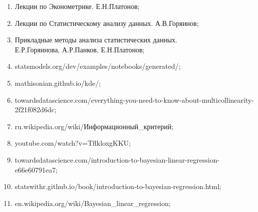\documentclass[a4paper,12pt]{article}
\begin{document}
\begin{enumerate}
    \item Лекции по Эконометрике. Е.Н.Платонов;
    \item Лекции по Статистическому анализу данных. А.В.Горяинов;
    \item Прикладные методы анализа статистических данных.\\
    Е.Р.Горяинова, А.Р.Панков, Е.Н.Платонов;
    \item statsmodels.org/dev/examples/notebooks/generated/;
    \item mathisonian.github.io/kde/;
    \item towardsdatascience.com/everything-you-need-to-know-about-multicollinearity-2f21f082d6dc;
    \item ru.wikipedia.org/wiki/Информационный\_критерий;
    \item youtube.com/watch?v=TflkloxgKKU;
    \item towardsdatascience.com/introduction-to-bayesian-linear-regression-e66e60791ea7;
    \item statswithr.github.io/book/introduction-to-bayesian-regression.html;
    \item en.wikipedia.org/wiki/Bayesian\_linear\_regression;
\end{enumerate}
\end{document}
